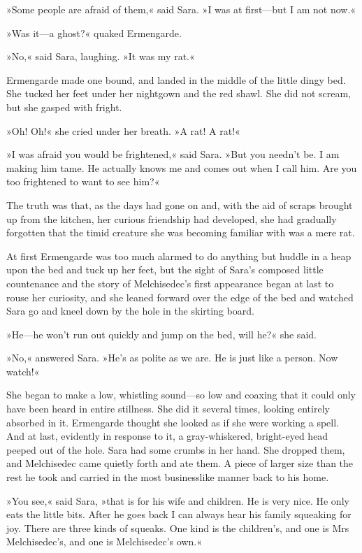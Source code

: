 »Some people are afraid of them,« said Sara. »I was at first—but I am not now.«

»Was it—a ghost?« quaked Ermengarde.

»No,« said Sara, laughing. »It was my rat.«

Ermengarde made one bound, and landed in the middle of the little dingy bed. She tucked her feet under her nightgown and the red shawl. She did not scream, but she gasped with fright.

»Oh! Oh!« she cried under her breath. »A rat! A rat!«

»I was afraid you would be frightened,« said Sara. »But you needn't be. I am making him tame. He actually knows me and comes out when I call him. Are you too frightened to want to see him?«

The truth was that, as the days had gone on and, with the aid of scraps brought up from the kitchen, her curious friendship had developed, she had gradually forgotten that the timid creature she was becoming familiar with was a mere rat.

At first Ermengarde was too much alarmed to do anything but huddle in a heap upon the bed and tuck up her feet, but the sight of Sara's composed little countenance and the story of Melchisedec's first appearance began at last to rouse her curiosity, and she leaned forward over the edge of the bed and watched Sara go and kneel down by the hole in the skirting board.

»He—he won't run out quickly and jump on the bed, will he?« she said.

»No,« answered Sara. »He's as polite as we are. He is just like a person. Now watch!«

She began to make a low, whistling sound—so low and coaxing that it could only have been heard in entire stillness. She did it several times, looking entirely absorbed in it. Ermengarde thought she looked as if she were working a spell. And at last, evidently in response to it, a gray-whiskered, bright-eyed head peeped out of the hole. Sara had some crumbs in her hand. She dropped them, and Melchisedec came quietly forth and ate them. A piece of larger size than the rest he took and carried in the most businesslike manner back to his home.

»You see,« said Sara, »that is for his wife and children. He is very nice. He only eats the little bits. After he goes back I can always hear his family squeaking for joy. There are three kinds of squeaks. One kind is the children's, and one is Mrs Melchisedec's, and one is Melchisedec's own.«

